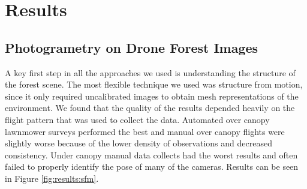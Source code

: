 \chapter{Results} \label{chapResults}
\section{Photogrametry on Drone Forest Images}
A key first step in all the approaches we used is understanding the structure of the forest scene. The most flexible technique we used was structure from motion, since it only required uncalibrated images to obtain mesh representations of the environment. We found that the quality of the results depended heavily on the flight pattern that was used to collect the data. Automated over canopy lawnmower surveys performed the best and manual over canopy flights were slightly worse because of the lower density of observations and decreased consistency. Under canopy manual data collects had the worst results and often failed to properly identify the pose of many of the cameras. Results can be seen in Figure \ref{fig:results:sfm}.

